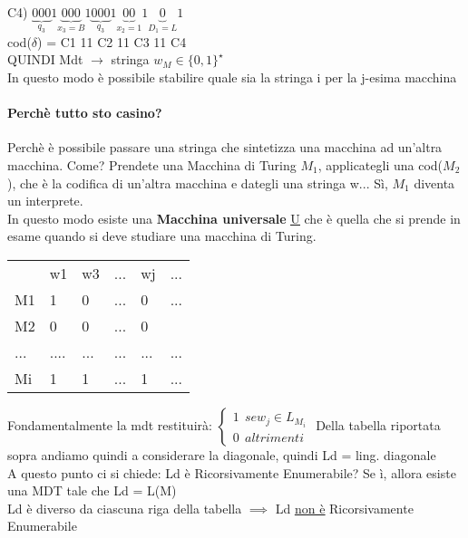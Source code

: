 \documentclass[12pt, a4paper, openany, oneside]{book}
\begin{document}
C4) $\underbrace{000}_{q_{3}}1\underbrace{000}_{x_{3} = B}1\underbrace{000}_{q_{3}}1\underbrace{00}_{x_{2} = 1}1\underbrace{0}_{D_{1} = L}1$\\
cod($\delta$) = C1 11 C2 11 C3 11 C4\\
QUINDI Mdt $\to$ stringa $w_{M} \in \{0,1\}^{\star}$\\
In questo modo è possibile stabilire quale sia la stringa i per la j-esima macchina
\paragraph{Perchè tutto sto casino? }Perchè è possibile passare una stringa che
sintetizza una macchina ad un'altra macchina. Come? Prendete una Macchina di
Turing $M_{1}$, applicategli una cod($M_{2}$), che è la codifica di un'altra macchina
e dategli una stringa w... Sì, $M_{1}$ diventa un interprete.\\ In questo modo
esiste una \textbf{Macchina universale} \underline{\underline{\underline{U}}} che 
è quella che si prende in esame quando si deve studiare una macchina di Turing.
\begin{table}[]
\begin{tabular}{llllll}
                         & w1                        & w3                       & ...                      & wj                       & ...                      \\ \cline{2-6} 
\multicolumn{1}{l|}{M1}  & \multicolumn{1}{l|}{1}    & \multicolumn{1}{l|}{0}   & \multicolumn{1}{l|}{...} & \multicolumn{1}{l|}{0}   & \multicolumn{1}{l|}{...} \\ \cline{2-6} 
\multicolumn{1}{l|}{M2}  & \multicolumn{1}{l|}{0}    & \multicolumn{1}{l|}{0}   & \multicolumn{1}{l|}{...} & \multicolumn{1}{l|}{0} & \multicolumn{1}{l|}{}    \\ \cline{2-6} 
\multicolumn{1}{l|}{...} & \multicolumn{1}{l|}{....} & \multicolumn{1}{l|}{...} & \multicolumn{1}{l|}{...} & \multicolumn{1}{l|}{...} & \multicolumn{1}{l|}{...} \\ \cline{2-6} 
\multicolumn{1}{l|}{Mi}  & \multicolumn{1}{l|}{1}    & \multicolumn{1}{l|}{1}   & \multicolumn{1}{l|}{...} & \multicolumn{1}{l|}{1}   & \multicolumn{1}{l|}{...} \\ \cline{2-6} 
\end{tabular}
\end{table}
Fondamentalmente la mdt restituirà: 
$\begin{cases}
	1 ~~ se w_{j} \in L_{M_{i}}\\
	0 ~~ altrimenti
\end{cases}$
Della tabella riportata sopra andiamo quindi a considerare la diagonale, quindi
Ld = ling. diagonale \\
A questo punto ci si chiede: Ld è Ricorsivamente Enumerabile? Se ì, allora esiste
una MDT tale che Ld = L(M)\\
Ld è diverso da ciascuna riga della tabella $\implies$ Ld \underline{\underline{non è}}
Ricorsivamente Enumerabile
\end{document}
